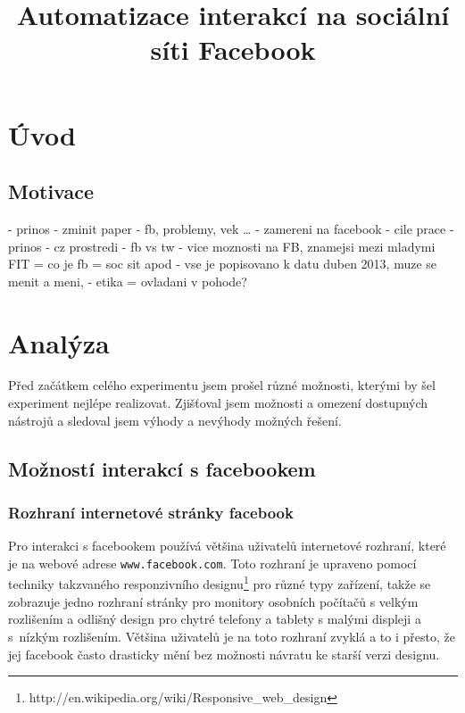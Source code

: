 \documentclass[thesis=M,czech]{FITthesis}[2013/05/10]
\title{Automatizace interakcí na sociální síti Facebook}
\begin{document}


\chapter{{\' U}vod}
\section{Motivace}
- prinos
- zminit paper
- fb, problemy, vek …
- zamereni na facebook
- cile prace
- prinos
- cz prostredi
- fb vs tw - vice moznosti na FB, znamejsi mezi mladymi
FIT
= co je fb = soc sit apod
- vse je popisovano k datu duben 2013, muze se menit a meni,
- etika = ovladani v pohode?


\chapter{Analýza}

Před začátkem celého experimentu jsem prošel různé možnosti, kterými by šel experiment nejlépe realizovat. Zjišťoval jsem možnosti a omezení dostupných nástrojů a sledoval jsem výhody a nevýhody možných řešení. 

\section{Možností interakcí s facebookem}

\subsection{Rozhraní internetové stránky facebook}
Pro interakci s facebookem používá většina uživatelů internetové rozhraní, které je na webové adrese \verb|www.facebook.com|. Toto rozhraní je upraveno pomocí techniky takzvaného responzivního designu\footnote{http://en.wikipedia.org/wiki/Responsive\_web\_design} pro různé typy zařízení, takže se zobrazuje jedno rozhraní stránky pro monitory osobních počítačů s velkým rozlišením a odlišný design pro chytré telefony a tablety s malými displeji a s~nízkým rozlišením. Většina uživatelů je na toto rozhraní zvyklá a to i přesto, že jej facebook často drasticky mění bez možnosti návratu ke starší verzi designu. 
\end{document}

